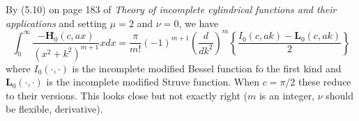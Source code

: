 \documentclass[11pt]{article}
\begin{document}
 




By (5.10) on page 183 of \textit{Theory of incomplete cylindrical functions and their applications} and setting $\mu = 2$ and $\nu = 0$, we have $$\int_0^\infty \frac{-\boldsymbol{H}_{0}(c, ax)}{(x^2 + k^2)^{m+1}}x dx = \frac{\pi}{m!} (-1)^{m+1} \left(\frac{d}{dk^2}\right)^{m}\left\{\frac{I_{0}(c, ak) - \boldsymbol{L}_0(c, ak)}{2}\right\}$$where $I_0(\cdot, \cdot)$ is the incomplete modified Bessel function fo the first kind and $\boldsymbol{L}_0(\cdot, \cdot)$ is the incomplete modified Struve function. When $c=  \pi/2$ these reduce to their  versions. This looks close but not exactly right ($m$ is an integer, $\nu$ should be flexible, derivative).



% 
\end{document}
